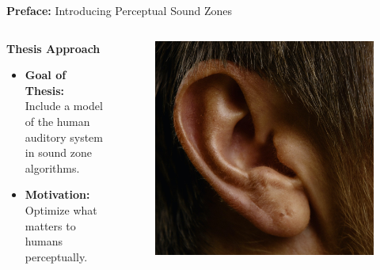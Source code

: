 \documentclass[aspectratio=169]{beamer}
\begin{document}
\begin{frame}{\textbf{Preface:} Introducing Perceptual Sound Zones}
    \begin{columns}[c]
        \begin{block}{\textbf{Thesis Approach}}
            \begin{itemize}
                \item \textbf{Goal of Thesis:}\\ Include a model of the human auditory system in sound zone algorithms.
                \item \textbf{Motivation:}\\ Optimize what matters to humans perceptually.
            \end{itemize}
        \end{block}
        \begin{figure}
            \centering
            \includegraphics[scale=0.07]{ear.jpg}
        \end{figure}
    \end{columns}
\end{frame}
\end{document}
